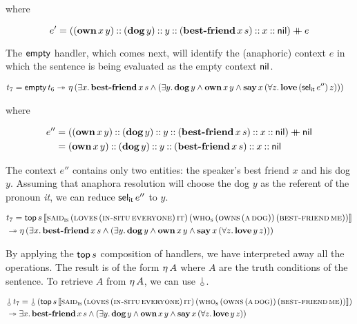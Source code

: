 where

$$
e' = ((\textbf{own}\,x\,y) \mathbin{::} (\textbf{dog}\,y) \mathbin{::} y \mathbin{::}
(\textbf{best-friend}\,x\,s) \mathbin{::} x \mathbin{::} \mathsf{nil}) \mathbin{+\mkern-10mu+} e
$$

The $\mathsf{empty}$ handler, which comes next, will identify the (anaphoric)
context $e$ in which the sentence is being evaluated as the empty context
$\mathsf{nil}$.

\begin{align*}
  t_7 = \mathsf{empty}\,t_6 \twoheadrightarrow \
  &\eta\,(\exists x.\, \textbf{best-friend}\,x\,s \land
          (\exists y.\, \textbf{dog}\,y \land \textbf{own}\,x\,y \land
           \textbf{say}\,x\,(\forall z.\, \textbf{love}\,(\mathsf{sel}_{\mathsf{it}}\,e'')\,z)))
\end{align*}

where

\begin{align*}
e'' &= ((\textbf{own}\,x\,y) \mathbin{::} (\textbf{dog}\,y) \mathbin{::} y \mathbin{::}
(\textbf{best-friend}\,x\,s) \mathbin{::} x \mathbin{::} \mathsf{nil}) \mathbin{+\mkern-10mu+} \mathsf{nil} \\
    &= (\textbf{own}\,x\,y) \mathbin{::} (\textbf{dog}\,y) \mathbin{::} y \mathbin{::}
(\textbf{best-friend}\,x\,s) \mathbin{::} x \mathbin{::} \mathsf{nil}
\end{align*}

The context $e''$ contains only two entities: the speaker's best friend $x$
and his dog $y$. Assuming that anaphora resolution will choose the dog $y$
as the referent of the pronoun \emph{it}, we can reduce $\mathsf{sel}_{\mathsf{it}}\,e''$
to $y$.

\begin{align*}
  &t_7 = \mathsf{top}\,s\,\llbracket \textsc{said}_{\textsc{is}}\,(\textsc{loves}\,(\textsc{in-situ}\,\textsc{everyone})\,\textsc{it})\,(\textsc{who}_{\textsc{s}}\,(\textsc{owns}\,(\textsc{a}\,\textsc{dog}))\,(\textsc{best-friend}\,\textsc{me})) \rrbracket \\
  &\twoheadrightarrow \eta\,(\exists x.\, \textbf{best-friend}\,x\,s \land
              (\exists y.\, \textbf{dog}\,y \land \textbf{own}\,x\,y \land
               \textbf{say}\,x\,(\forall z.\, \textbf{love}\,y\,z)))
\end{align*}

By applying the $\mathsf{top}\,s$ composition of handlers, we have interpreted
away all the operations. The result is of the form $\eta\,A$ where $A$ are
the truth conditions of the sentence. To retrieve $A$ from $\eta\,A$, we
can use $\cherry$.

\begin{align*}
& \ap{\cherry}{t_7} = \ap{\cherry}{(\app{\TOP}{s}{\sem{\app{\abs{said}_{\abs{is}}}{(\app{\abs{loves}}{(\ap{\abs{in-situ}}{\abs{everyone}})}{\abs{it}})}{(\app{\abs{who}_{\abs{s}}}{(\ap{\abs{owns}}{(\ap{\abs{a}}{\abs{dog}})})}{(\ap{\abs{best-friend}}{\abs{me}})})}}})} \\
& \tto \exists x.\, \app{\obj{best-friend}}{x}{s} \land (\exists y.\, \ap{\obj{dog}}{y} \land \app{\obj{own}}{x}{y} \land \app{\obj{say}}{x}{(\forall z.\, \app{\obj{love}}{y}{z})})
\end{align*}



